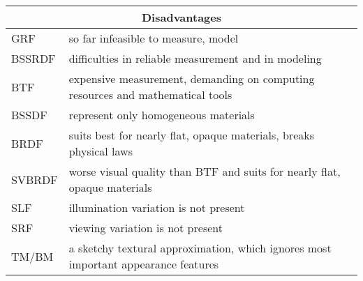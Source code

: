 \begin{tabular}{ |l|l| }
  \hline
  \multicolumn{2}{|c|}{Disadvantages} \\
  \hline
  GRF &  so far infeasible to measure, model\\
  BSSRDF &  difficulties in reliable measurement and in modeling \\
  BTF &  expensive measurement, demanding on computing resources and mathematical tools \\
  BSSDF & represent only homogeneous materials\\
  BRDF & suits best for nearly flat, opaque materials, breaks physical laws \\
  SVBRDF & worse visual quality than BTF and suits for nearly flat, opaque materials \\
  SLF & illumination variation is not present \\
  SRF & viewing variation is not present  \\
  TM/BM & a sketchy textural approximation, which ignores most important appearance features\\
  \hline
\end{tabular}
